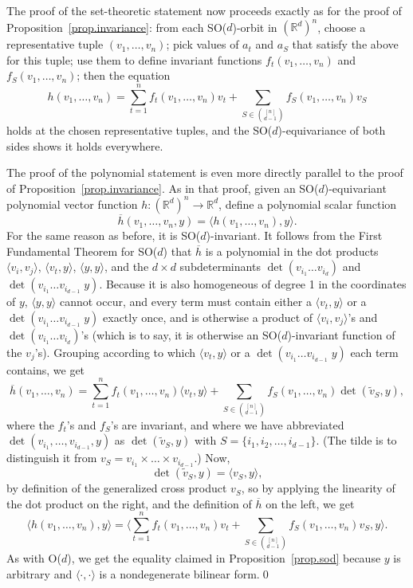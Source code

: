 \documentclass{article}
\theoremstyle{Hogg}
\newcommand{\inner}[2]{\langle{#1},{#2}\rangle}
\begin{document}
The proof of the set-theoretic statement now proceeds exactly as for the proof of Proposition~\ref{prop.invariance}: from each SO($d$)-orbit in $(\mathbb R^d)^n$, choose a representative tuple $(v_1,\dots,v_n)$; pick values of $a_t$ and $a_S$ that satisfy the above for this tuple; use them to define invariant functions $f_t(v_1,\dots,v_n)$ and $f_S(v_1,\dots,v_n)$; then the equation
\begin{equation}
h(v_1,\dots,v_n) = \sum_{t=1}^n f_t(v_1,\dots,v_n)v_t + \sum_{S\in \binom{[n]}{d-1}}f_S(v_1,\dots,v_n)v_S
\end{equation}
holds at the chosen representative tuples, and the SO($d$)-equivariance of both sides shows it holds everywhere.

The proof of the polynomial statement is even more directly parallel to the proof of Proposition~\ref{prop.invariance}. As in that proof, given an SO($d$)-equivariant polynomial vector function $h:(\mathbb R^d)^n\rightarrow \mathbb R^d$, define a polynomial scalar function
\begin{equation}
\overline h(v_1,\dots,v_n,y) = \inner{h(v_1,\dots,v_n)}{y}.
\end{equation}
For the same reason as before, it is SO($d$)-invariant. It follows from the First Fundamental Theorem for SO($d$) that $\overline h$ is a polynomial in the dot products $\langle v_i,v_j\rangle$, $\langle v_t,y\rangle$, $\langle y,y\rangle$, and the $d\times d$ subdeterminants $\det(v_{i_1}\dots v_{i_d})$ and $\det(v_{i_1}\dots v_{i_{d-1}}\; y)$. Because it is also homogeneous of degree 1 in the coordinates of $y$, $\langle y,y\rangle$ cannot occur, and every term must contain either a $\langle v_t,y\rangle$ or a $\det(v_{i_1}\dots v_{i_{d-1}}\; y)$ exactly once, and is otherwise a product of $\langle v_i,v_j\rangle$'s and $\det(v_{i_1}\dots v_{i_d})$'s (which is to say, it is otherwise an SO($d$)-invariant function of the $v_j$'s). Grouping according to which $\langle v_t,y\rangle$ or a $\det(v_{i_1}\dots v_{i_{d-1}}\; y)$ each term contains, we get
\begin{equation}
\overline h(v_1,\dots,v_n) = \sum_{t=1}^n f_t(v_1,\dots,v_n)\langle v_t,y\rangle + \sum_{S\in \binom{[n]}{d-1}}f_S(v_1,\dots,v_n)\det(\tilde v_S,y),
\end{equation}
where the $f_t$'s and $f_S$'s are invariant, and where we have abbreviated $\det(v_{i_1},\dots,v_{i_{d-1}},y)$ as $\det(\tilde v_S,y)$ with $S = \{i_1,i_2,\dots,i_{d-1}\}$. (The tilde is to distinguish it from $v_S = v_{i_1}\times\dots\times v_{i_{d-1}}$.) Now,
\begin{equation}
\det(\tilde v_S,y) = \langle v_S,y\rangle,
\end{equation}
by definition of the generalized cross product $v_S$, so by applying the linearity of the dot product on the right, and the definition of $\overline h$ on the left, we get
\begin{equation}
\langle h(v_1,\dots,v_n), y \rangle= \langle \sum_{t=1}^n f_t(v_1,\dots,v_n)v_t + \sum_{S\in \binom{[n]}{d-1}} f_S(v_1,\dots,v_n)v_S, y\rangle.
\end{equation}
As with O($d$), we get the equality claimed in Proposition~\ref{prop.sod} because $y$ is arbitrary and $\langle\cdot,\cdot\rangle$ is a nondegenerate bilinear form.\qed
\end{document}
